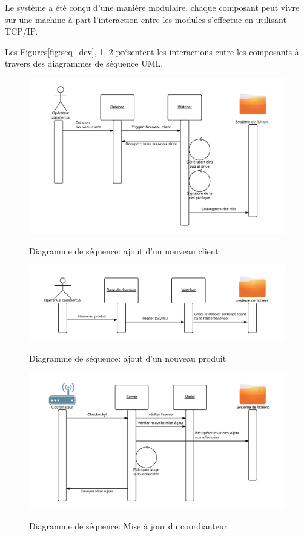 \documentclass{themeensg}
\begin{document}
Le système a été conçu d'une manière modulaire, chaque composant peut vivre sur une machine à part l’interaction entre les modules s'effectue en utilisant TCP/IP.

Les Figures\ref{fig:seq_dev}, \ref{fig:new_client}, \ref{fig:new_product} présentent les interactions entre les composants à travers des diagrammes de séquence UML.

\begin{figure}
\centering
\includegraphics[scale=0.8]{images/new_client.png}
\label{fig:new_client}
\caption{Diagramme de séquence: ajout d'un nouveau client}
\end{figure}

\begin{figure}
\centering
\includegraphics[scale=0.8]{images/new_product.png}
\label{fig:new_product}
\caption{Diagramme de séquence: ajout d'un nouveau produit}
\end{figure}

\begin{figure}
\centering\includegraphics[scale=0.8]{images/maj.png}
\label{fig:maj}
\caption{Diagramme de séquence: Mise à jour du coordianteur}
\end{figure}
\end{document}

